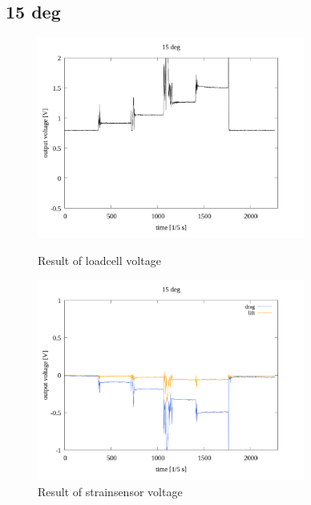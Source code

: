 \documentclass[twocolumn,a4j]{jsarticle}
\begin{document}
\subsection{15 deg}
\begin{figure}[htbp]
    \footnotesize
    \begin{center}
        \includegraphics[width=88mm]{../images/reverse/15_loadcell.png}
        \caption{Result of loadcell voltage}
        \includegraphics[width=88mm]{../images/reverse/15_strainsensor.png}
        \caption{Result of strainsensor voltage}
    \end{center}
\end{figure}

\newpage
\end{document}
